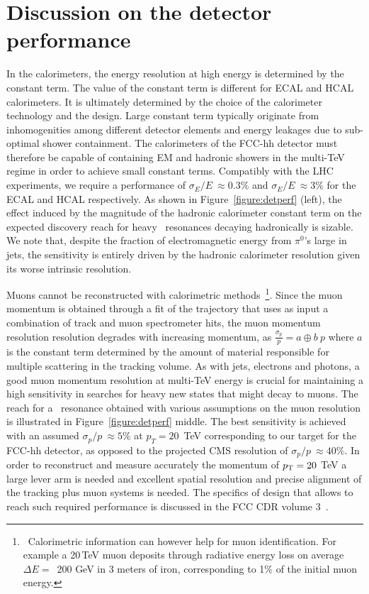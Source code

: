 \documentclass[a4paper,11pt]{article}
\begin{document}
\section{Discussion on the detector performance}
\label{sec:detperf}

In the calorimeters, the energy resolution at high energy is determined by the constant term. The value of the constant term is different for ECAL and HCAL calorimeters. It is ultimately determined by the choice of the calorimeter technology and the design. Large constant term typically originate from inhomogenities among different detector elements and energy leakages due to sub-optimal shower containment. The calorimeters of the FCC-hh detector must therefore be capable of containing EM and hadronic showers in the multi-TeV regime in order to achieve small constant terms.
Compatibly with the LHC experiments, we require a performance of $\sigma_E/E~ \approx 0.3 \%$ and $\sigma_E/E~ \approx 3\%$ for the ECAL and HCAL respectively. As shown in Figure~\ref{figure:detperf} (left), the effect induced by the magnitude of the hadronic calorimeter constant term on the expected discovery reach for heavy \ZpSSM\ resonances decaying hadronically is sizable. We note that, despite the fraction of electromagnetic energy from $\pi^0$'s large in jets, the sensitivity is entirely driven by the hadronic calorimeter resolution given its worse intrinsic resolution.

Muons cannot be reconstructed with calorimetric methods~\footnote{~Calorimetric information can however help for muon identification. For example a 20\,TeV muon deposits through radiative energy loss on average $\Delta E=$~200 GeV in 3 meters of iron, corresponding to 1\% of the initial muon energy.}. Since the muon momentum is obtained through a fit of the trajectory that uses as input a combination of track and muon spectrometer hits, the muon momentum resolution resolution degrades with increasing momentum, as $\frac{\sigma_p}{p}= a \oplus b~p$ where $a$ is the constant term determined by the amount of material responsible for multiple scattering in the tracking volume. As with jets, electrons and photons, a good muon momentum resolution at multi-TeV energy is crucial for maintaining a high sensitivity in searches for heavy new states that might decay to muons. The reach for a \Zpmumu\ resonance obtained with various assumptions on the muon resolution is illustrated in Figure~\ref{figure:detperf} middle. The best sensitivity is achieved with an assumed $\sigma_p/p~ \approx 5\%$ at $p_T = 20$~TeV corresponding to our target for the FCC-hh detector, as opposed to the projected CMS resolution of $\sigma_p/p~\approx 40\%$. In order to reconstruct and measure accurately the momentum of $p_{\text{T}}=20~$TeV a large lever arm is needed and excellent spatial resolution and precise alignment of the tracking plus muon systems is needed. The specifics of design that allows to reach such required performance is discussed in the FCC CDR volume 3~\cite{cdr_volume3}.
\end{document}
